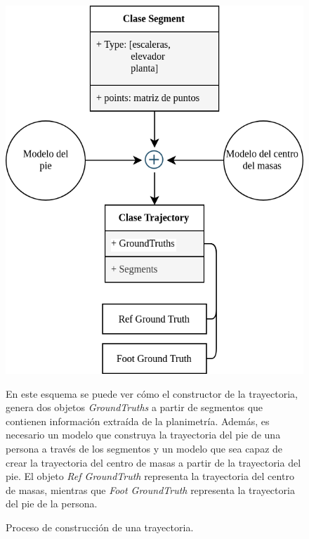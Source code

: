 \begin{figure}[ht!]
    \centering
    \includegraphics[width=0.75\columnwidth]{img/Design/trajectory.png}
    \caption{Proceso de construcción de una trayectoria.}
    \label{TrajectorySch}
    \small
    En este esquema se puede ver cómo el constructor de la trayectoria, genera dos objetos \emph{GroundTruths} a partir de segmentos que contienen información extraída de la planimetría. Además, es necesario un modelo que construya la trayectoria del pie de una persona a través de los segmentos y un modelo que sea capaz de crear la trayectoria del centro de masas a partir de la trayectoria del pie. El objeto \emph{Ref GroundTruth} representa la trayectoria del centro de masas, mientras que \emph{Foot GroundTruth} representa la trayectoria del pie de la persona.
\end{figure}




